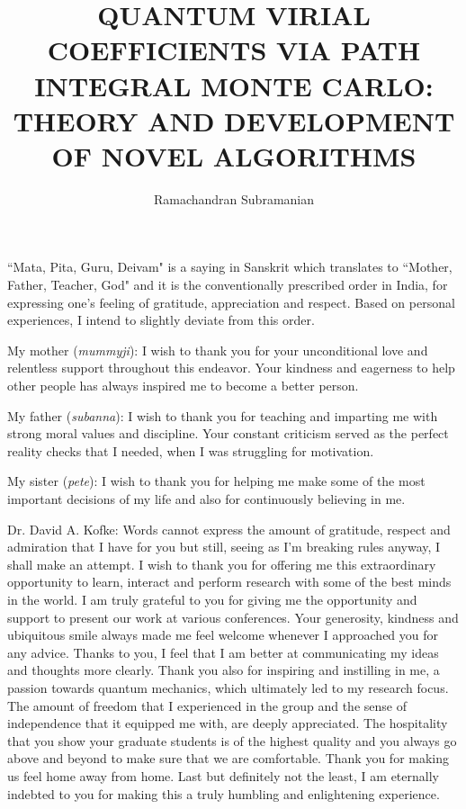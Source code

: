 \documentclass[a4paper,11pt,english,twoside]{ubthesis}
\title{QUANTUM VIRIAL COEFFICIENTS VIA PATH INTEGRAL MONTE CARLO: THEORY AND DEVELOPMENT OF NOVEL ALGORITHMS}
\author{Ramachandran Subramanian}
\begin{document}
\begin{titlepage}
\maketitle
\end{titlepage}

\begin{ubfrontmatter}
\makecopyright
\cleardoublepage
\begin{acknowledgements}
    ``Mata, Pita, Guru, Deivam" is a saying in Sanskrit which translates to ``Mother, Father, Teacher, God" and it is the conventionally prescribed order in India, for expressing one's feeling of gratitude, appreciation and respect. Based on personal experiences, I intend to slightly deviate from this order.

    \noindent My mother (\emph{mummyji}): I wish to thank you for your unconditional love and relentless support throughout this endeavor. Your kindness and eagerness to help other people has always inspired me to become a better person.
    
    \noindent My father (\emph{subanna}): I wish to thank you for teaching and imparting me with strong moral values and discipline. Your constant criticism served as the perfect reality checks that I needed, when I was struggling for motivation.

    \noindent My sister (\emph{pete}): I wish to thank you for helping me make some of the most important decisions of my life and also for continuously believing in me.

    \noindent Dr. David A. Kofke: Words cannot express the amount of gratitude, respect and admiration that I have for you but still, seeing as I'm breaking rules anyway, I shall make an attempt. I wish to thank you for offering me this extraordinary opportunity to learn, interact and perform research with some of the best minds in the world. I am truly grateful to you for giving me the opportunity and support to present our work at various conferences. Your generosity, kindness and ubiquitous smile always made me feel welcome whenever I approached you for any advice. Thanks to you, I feel that I am better at communicating my ideas and thoughts more clearly. Thank you also for inspiring and instilling in me, a passion towards quantum mechanics, which ultimately led to my research focus. The amount of freedom that I experienced in the group and the sense of independence that it equipped me with, are deeply appreciated. The hospitality that you show your graduate students is of the highest quality and you always go above and beyond to make sure that we are comfortable. Thank you for making us feel home away from home. Last but definitely not the least, I am eternally indebted to you for making this a truly humbling and enlightening experience.


\end{acknowledgements}
\end{ubfrontmatter}
\end{document}
